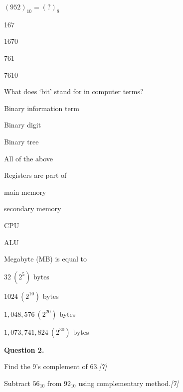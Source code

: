 \documentclass[11pt,a4paper]{article}
\newcommand{\pts}[1]{\hfill   \textit{[#1]}}
\begin{document}
{\begin{parts}
  \item $(952)_{10} = (?)_{8}$
    
\begin{parts}
      \item 167
      \item 1670
      \item 761
      \item 7610
    \end{parts}

  \item What does `bit' stand for in computer terms?
    
\begin{parts}
      \item Binary information term
      \item Binary digit
      \item Binary tree
      \item All of the above
    \end{parts}

  \item Registers are part of
    
\begin{parts}
      \item main memory
      \item secondary memory
      \item CPU
      \item ALU
    \end{parts}

  \item Megabyte (MB) is equal to
    
\begin{parts}
      \item $32\ (2^5)$ bytes
      \item $1024\ (2^{10})$ bytes
      \item $1,048,576\ (2^{20})$ bytes
      \item $1,073,741,824\ (2^{30})$ bytes
    \end{parts}
\end{parts}

\bigskip



\noindent   \textbf{Question 2.}

\begin{parts}
  \item Find the 9's complement of 63.\pts{7}
  \item Subtract $56_{10}$ from $92_{10}$ using complementary method.\pts{7}
\end{parts}

}
\end{document}
